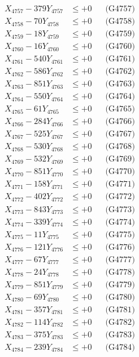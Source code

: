 \documentclass[a4paper,10pt]{article}
\begin{document}
{\begin{align}
X_{4757} - 379Y_{4757} &\leq +0 && \text{(G4757)} \\
X_{4758} - 70Y_{4758} &\leq +0 && \text{(G4758)} \\
X_{4759} - 18Y_{4759} &\leq +0 && \text{(G4759)} \\
X_{4760} - 16Y_{4760} &\leq +0 && \text{(G4760)} \\
\allowbreak
X_{4761} - 540Y_{4761} &\leq +0 && \text{(G4761)} \\
X_{4762} - 586Y_{4762} &\leq +0 && \text{(G4762)} \\
X_{4763} - 851Y_{4763} &\leq +0 && \text{(G4763)} \\
X_{4764} - 550Y_{4764} &\leq +0 && \text{(G4764)} \\
X_{4765} - 61Y_{4765} &\leq +0 && \text{(G4765)} \\
X_{4766} - 284Y_{4766} &\leq +0 && \text{(G4766)} \\
X_{4767} - 525Y_{4767} &\leq +0 && \text{(G4767)} \\
X_{4768} - 530Y_{4768} &\leq +0 && \text{(G4768)} \\
X_{4769} - 532Y_{4769} &\leq +0 && \text{(G4769)} \\
X_{4770} - 851Y_{4770} &\leq +0 && \text{(G4770)} \\
\allowbreak
X_{4771} - 158Y_{4771} &\leq +0 && \text{(G4771)} \\
X_{4772} - 402Y_{4772} &\leq +0 && \text{(G4772)} \\
X_{4773} - 843Y_{4773} &\leq +0 && \text{(G4773)} \\
X_{4774} - 339Y_{4774} &\leq +0 && \text{(G4774)} \\
X_{4775} - 11Y_{4775} &\leq +0 && \text{(G4775)} \\
X_{4776} - 121Y_{4776} &\leq +0 && \text{(G4776)} \\
X_{4777} - 67Y_{4777} &\leq +0 && \text{(G4777)} \\
X_{4778} - 24Y_{4778} &\leq +0 && \text{(G4778)} \\
X_{4779} - 851Y_{4779} &\leq +0 && \text{(G4779)} \\
X_{4780} - 69Y_{4780} &\leq +0 && \text{(G4780)} \\
\allowbreak
X_{4781} - 357Y_{4781} &\leq +0 && \text{(G4781)} \\
X_{4782} - 114Y_{4782} &\leq +0 && \text{(G4782)} \\
X_{4783} - 375Y_{4783} &\leq +0 && \text{(G4783)} \\
X_{4784} - 239Y_{4784} &\leq +0 && \text{(G4784)} \\

\end{align}}
\end{document}
